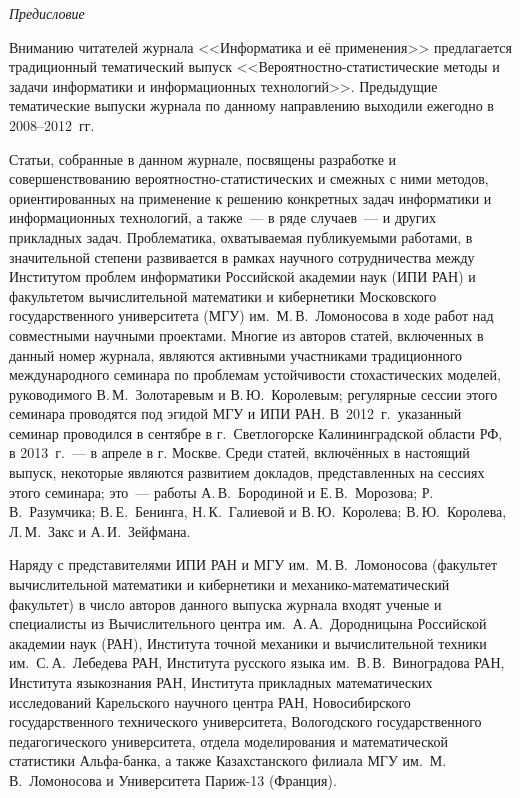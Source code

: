 
   { %
   { %
   
   \vspace*{-24pt}
   \begin{center}\LARGE
   \textit{Предисловие}
   \end{center}
   
   
   \vspace*{25mm}
   
   \thispagestyle{empty}
   
   { %

      Вниманию читателей журнала <<Информатика и её применения>> предлагается 
традиционный тематический выпуск <<Вероятностно-статистические методы и задачи 
информатики и информационных технологий>>. Предыдущие тематические выпуски 
журнала по данному направлению выходили ежегодно в 2008--2012~гг. 
      
      Статьи, собранные в данном журнале, посвящены разработке и 
совершенствованию вероятностно-статистических и смежных с ними методов, 
ориентированных на применение к решению конкретных задач информатики и 
информационных технологий, а также~--- в ряде случаев~--- и других прикладных задач. 
Проблематика, охватываемая публикуемыми работами, в значительной степени 
развивается в рамках научного сотрудничества между Институтом проблем информатики 
Российской академии наук (ИПИ РАН) и факультетом вычислительной математики и 
кибернетики Московского государственного университета (МГУ) им.\ 
М.\,В.~Ломоносова в ходе работ над совместными научными проектами. Многие из 
авторов статей, включенных в данный номер журнала, являются активными участниками 
традиционного международного семинара по проблемам устойчивости стохастических 
моделей, руководимого В.\,М.~Золотаревым и В.\,Ю.~Королевым; регулярные сессии 
этого семинара проводятся под эгидой МГУ и ИПИ РАН. В~2012~г.\ указанный семинар 
проводился в сентябре в г.~Светлогорске Калининградской области РФ, в 2013~г.~--- в 
апреле в г. Москве. Среди статей, включённых в настоящий выпуск, некоторые являются 
развитием докладов, представленных на сессиях этого семинара; это~--- работы 
А.\,В.~Бородиной и Е.\,В.~Морозова; Р.\,В.~Разумчика; В.\,Е.~Бенинга, Н.\,К.~Галиевой и 
В.\,Ю.~Королева; В.\,Ю.~Королева, Л.\,М.~Закс и А.\,И.~Зейфмана.
      
      Наряду с представителями ИПИ РАН и МГУ им.\ М.\,В.~Ломоносова (факультет 
вычислительной математики и кибернетики и механико-математический факультет) в 
число авторов данного выпуска журнала входят ученые и специалисты из 
Вычислительного центра им.\ А.\,А.~Дородницына Российской академии наук (РАН), 
Института точной механики и вычислительной техники им.\ С.\,А.~Лебедева РАН, 
Института русского языка им.\ В.\,В.~Виноградова РАН, Института языкознания РАН, 
Института прикладных математических исследований Карельского научного центра 
РАН, Новосибирского государственного технического университета, Вологодского 
государственного педагогического университета, отдела моделирования и 
математической статистики Аль\-фа-бан\-ка, а также Казахстанского филиала МГУ им.\ 
М.\,В.~Ломоносова и Университета Париж-13 (Франция).
      
}}}
